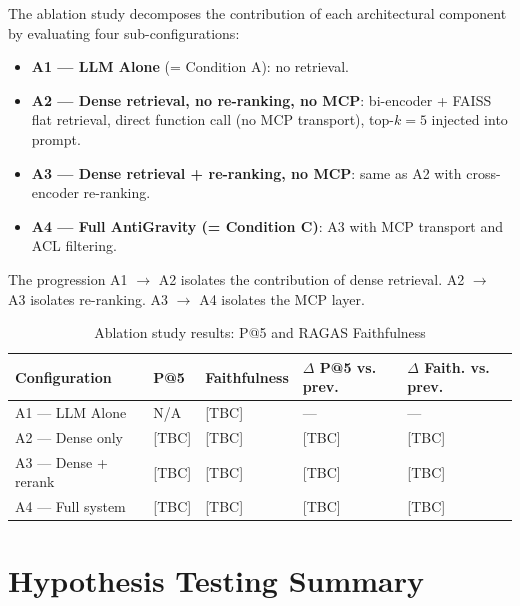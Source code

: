 The ablation study decomposes the contribution of each architectural component by evaluating four sub-configurations:

\begin{itemize}
\item \textbf{A1 --- LLM Alone} (= Condition A): no retrieval.
\item \textbf{A2 --- Dense retrieval, no re-ranking, no MCP}: bi-encoder + FAISS flat retrieval, direct function call (no MCP transport), top-$k=5$ injected into prompt.
\item \textbf{A3 --- Dense retrieval + re-ranking, no MCP}: same as A2 with cross-encoder re-ranking.
\item \textbf{A4 --- Full AntiGravity (= Condition C)}: A3 with MCP transport and ACL filtering.
\end{itemize}

The progression A1 $\to$ A2 isolates the contribution of dense retrieval. A2 $\to$ A3 isolates re-ranking. A3 $\to$ A4 isolates the MCP layer.

\begin{table}[H]
\centering
\caption{Ablation study results: P@5 and RAGAS Faithfulness}
\label{tab:ablation}
\begin{tabularx}{\textwidth}{@{}lXXXX@{}}
\toprule
\textbf{Configuration} & \textbf{P@5} & \textbf{Faithfulness} & \textbf{$\Delta$ P@5 vs. prev.} & \textbf{$\Delta$ Faith. vs. prev.} \\
\midrule
A1 --- LLM Alone & N/A & [TBC] & --- & --- \\
A2 --- Dense only & [TBC] & [TBC] & [TBC] & [TBC] \\
A3 --- Dense + rerank & [TBC] & [TBC] & [TBC] & [TBC] \\
A4 --- Full system & [TBC] & [TBC] & [TBC] & [TBC] \\
\bottomrule
\end{tabularx}
\end{table}


\section{Hypothesis Testing Summary}
\label{sec:eval-hypotheses}

